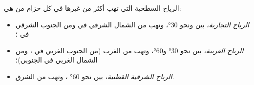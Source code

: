 \begin{definition}\label{def:g8:winds-global-circulation:global-winds}
الرياح السطحية التي تهب أكثر من غيرها في كل حزام من  هي:
\begin{itemize}
  \item \emph{الرياح التجارية}، بين  ونحو
        \ang{30}، وتهب من الشمال الشرقي في  ومن الجنوب
        الشرقي في ؛
  \item \emph{الرياح الغربية}، بين نحو \ang{30}
        و\ang{60}، وتهب من الغرب (من الجنوب الغربي في ،
        ومن الشمال الغربي في الجنوبي)؛
  \item \emph{الرياح الشرقية القطبية}، بين نحو
        \ang{60} ، وتهب من الشرق.
\end{itemize}
\end{definition}

